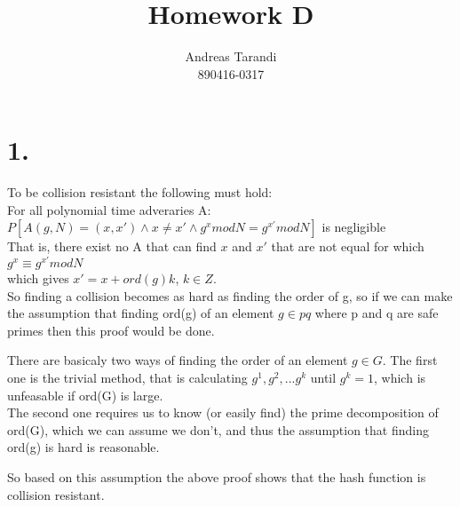 \documentclass[a4paper,11pt]{article}
\author{Andreas Tarandi\\890416-0317}
\title{Homework D}
\begin{document}
	\maketitle

	\section*{1. }
		To be collision resistant the following must hold:\\
		For all polynomial time adveraries A:
		$P[A(g, N) = (x, x') \wedge x \neq x' \wedge g^x mod N = g^{x'} mod N]$ is negligible\\
		That is, there exist no A that can find $x$ and $x'$ that are not equal for which\\
		$g^x \equiv g^{x'} mod N$\\
		which gives $x' = x + ord(g)k$, $k \in Z$.\\
		So finding a collision becomes as hard as finding the order of g, so if we can make the assumption that finding ord(g) of an element $g \in pq$ where p and q are safe primes then this proof would be done.

		There are basicaly two ways of finding the order of an element $g \in G$. The first one is the trivial method, that is calculating
		$g^1, g^2, ... g^k$ until $g^k = 1$, which is unfeasable if ord(G) is large. \\
		The second one requires us to know (or easily find) the prime decomposition of ord(G), which we can assume we don't, and thus the 
		assumption that finding ord(g) is hard is reasonable.

		So based on this assumption the above proof shows that the hash function is collision resistant.
\end{document}
